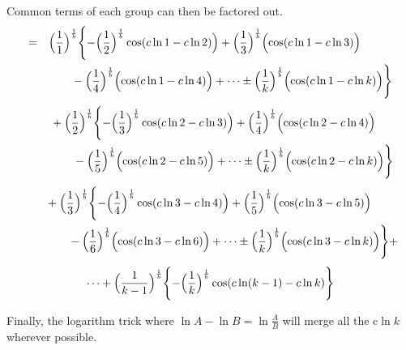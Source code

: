 \documentclass{amsart}
\begin{document}
	Common terms of each group can then be factored out.
	\[
	\begin{aligned}
		= \quad & \Bigl( \frac{1}{1} \Bigr)^\frac1b \Biggl\{ -\Bigl( \frac{1}{2} \Bigr)^\frac1b \cos(c \ln1 - c \ln 2) \Bigr) + \Bigl( \frac{1}{3} \Bigr)^\frac1b \Bigl( \cos(c \ln1 - c \ln3) \Bigr) \\
		& \qquad -\Bigl( \frac{1}{4} \Bigr)^\frac1b \Bigl( \cos(c \ln1 - c \ln4) \Bigr) + \dots  \pm \Bigl( \frac{1}{k} \Bigr)^\frac1b \Bigl( \cos(c \ln1 - c \ln k) \Bigr) \Biggr\}
	\end{aligned}
	\]
	\[
	\begin{aligned}
		\quad\quad & +\Bigl( \frac{1}{2}  \Bigr)^\frac1b \Biggl\{ -\Bigl( \frac{1}{3} \Bigr)^\frac1b \cos(c \ln2 - c \ln3) \Bigr) + \Bigl( \frac{1}{4} \Bigr)^\frac1b \Bigl( \cos(c \ln2 - c \ln4) \Bigr) \\
		& \qquad -\Bigl( \frac{1}{5} \Bigr)^\frac1b \Bigl( \cos(c \ln2 - c \ln5) \Bigr) + \dots \pm \Bigl( \frac{1}{k} \Bigr)^\frac1b \Bigl( \cos(c \ln2 - c \ln k) \Bigr) \Biggr\} 
	\end{aligned}
	\]
	\[
	\begin{aligned}
		\quad\quad & +\Bigl( \frac{1}{3} \Bigr)^\frac1b \Biggl\{ -\Bigl( \frac{1}{4} \Bigr)^\frac1b \cos(c \ln3 - c \ln4) \Bigr) + \Bigl( \frac{1}{5} \Bigr)^\frac1b \Bigl( \cos(c \ln3 - c \ln5) \Bigr) \\
		& \qquad -\Bigl( \frac{1}{6} \Bigr)^\frac1b \Bigl( \cos(c \ln3 - c \ln6) \Bigr) + \dots \pm \Bigl( \frac{1}{k} \Bigr)^\frac1b \Bigl( \cos(c \ln3 - c \ln k) \Bigr) \Biggr\} + 
	\end{aligned}
	\]
	\[ \dots + \Bigl( \frac{1}{k-1} \Bigr)^\frac1b \Biggl\{ -\Bigl( \frac{1}{k} \Bigr)^\frac1b \cos(c \ln (k-1) - c \ln k) \Biggr\} \]
	
	
	Finally, the logarithm trick where $ \ln{A} - \ln{B} = \ln{\frac{A}{B}} $ will merge all the c$\ln k$ wherever possible.
	
\end{document}
